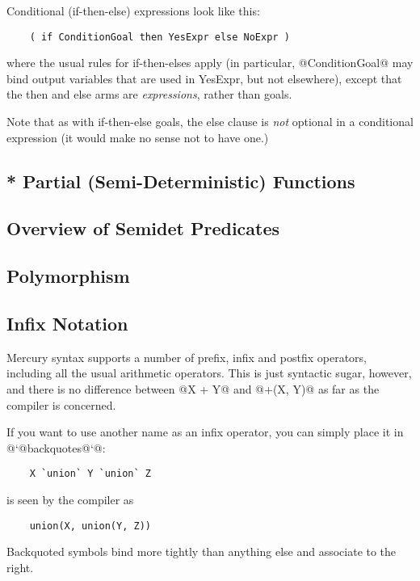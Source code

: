 Conditional (if-then-else) expressions look like this:
\begin{verbatim}
    ( if ConditionGoal then YesExpr else NoExpr )
\end{verbatim}
where the usual rules for if-then-elses apply (in particular,
@ConditionGoal@ may bind output variables that are used in
YesExpr, but not elsewhere), except that the then and else
arms are \emph{expressions}, rather than goals.

Note that as with if-then-else goals, the else clause is \emph{not}
optional in a conditional expression (it would make no sense
not to have one.)

\subsection{* Partial (Semi-Deterministic) Functions}


\subsection{Overview of Semidet Predicates}


\subsection{Polymorphism}


\subsection{Infix Notation}

Mercury syntax supports a number of prefix, infix and postfix
operators, including all the usual arithmetic operators.  This
is just syntactic sugar, however, and there is no difference
between @X + Y@ and @+(X, Y)@ as far as the compiler is concerned.

If you want to use another name as an infix operator, you can
simply place it in @`@backquotes@`@:
\begin{verbatim}
    X `union` Y `union` Z
\end{verbatim}
is seen by the compiler as
\begin{verbatim}
    union(X, union(Y, Z))
\end{verbatim}
Backquoted symbols bind more tightly than anything else and
associate to the right.



